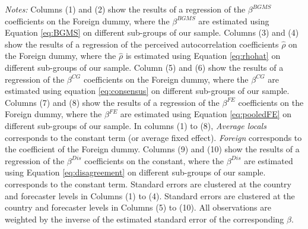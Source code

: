 \begin{table}[H]
{\begin{tabularx}{\linewidth}{l C C m{0.005\textwidth} C C m{0.005\textwidth} C C m{0.005\textwidth} C C m{0.005\textwidth} C C}
\end{tabularx}
\begin{flushleft}
\footnotesize \begin{minipage}{1.35\textwidth} \vspace{-10pt} \begin{tabnote} \textit{Notes:} Columns (1) and (2) show the results of a regression of the $\beta^{BGMS}$ coefficients on the Foreign dummy, where the $\beta^{BGMS}$ are estimated using Equation \eqref{eq:BGMS} on different sub-groups of our sample. Columns (3) and (4) show the results of a regression of the perceived autocorrelation coefficients $\hat\rho$ on the Foreign dummy, where the $\hat\rho$ is estimated using Equation \eqref{eq:rhohat} on different sub-groups of our sample. Column (5) and (6) show the results of a regression of the $\beta^{CG}$ coefficients on the Foreign dummy, where the $\beta^{CG}$ are estimated using equation \eqref{eq:consensus} on different sub-groups of our sample. Columns (7) and (8) show the results of a regression of the $\beta^{FE}$ coefficients on the Foreign dummy, where the $\beta^{FE}$ are estimated using Equation \eqref{eq:pooledFE} on different sub-groups of our sample. In columns (1) to (8), \textit{Average locals} corresponds to the constant term (or average fixed effect). \textit{Foreign} corresponds to the coefficient of the Foreign dummy. Columns (9) and (10) show the results of a regression of the $\beta^{Dis}$ coefficients on the constant, where the $\beta^{Dis}$ are estimated using Equation \eqref{eq:disagreement} on different sub-groups of our sample.  corresponds to the constant term. Standard errors are clustered at the country and forecaster levels in Columns (1) to (4). Standard errors are clustered at the country and forecaster levels in Columns (5) to (10). All observations are weighted by the inverse of the estimated standard error of the corresponding $\beta$. \end{tabnote} \end{minipage}  
\end{flushleft}
}
\end{table}
